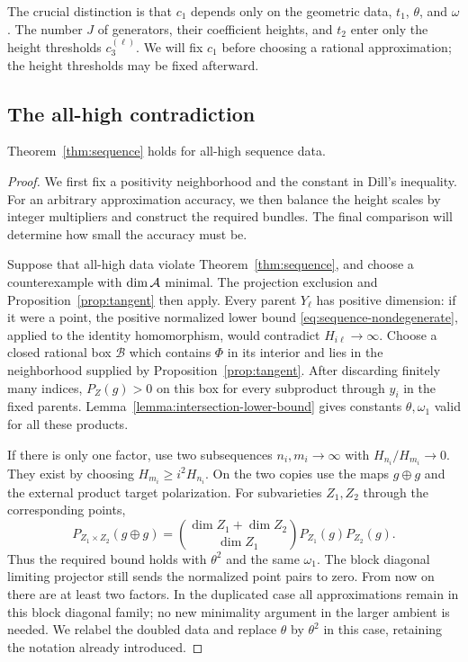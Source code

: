 The crucial distinction is that $c_1$ depends only on the geometric data,
$t_1$, $\theta$, and $\omega$.  The number $J$ of generators, their
coefficient heights, and $t_2$ enter only the height thresholds
$c_3^{(\ell)}$.  We will fix $c_1$ before choosing a rational
approximation; the height thresholds may be fixed afterward.

\subsection{The all-high contradiction}

\begin{theorem}\label{thm:all-high}
Theorem~\ref{thm:sequence} holds for all-high sequence data.
\end{theorem}

\begin{proof}
We first fix a positivity neighborhood and the constant in Dill's
inequality. For an arbitrary approximation accuracy, we then balance the
height scales by integer multipliers and construct the required bundles.
The final comparison will determine how small the accuracy must be.

Suppose that all-high data violate Theorem~\ref{thm:sequence}, and
choose a counterexample with $\dim\mathcal A$ minimal.
The projection exclusion and Proposition~\ref{prop:tangent} then apply.
Every parent $Y_\ell$ has positive dimension: if it were a point,
the positive normalized lower bound \eqref{eq:sequence-nondegenerate},
applied to the identity homomorphism, would contradict $H_{i\ell}\to\infty$.
Choose a closed rational box $\mathcal B$ which contains $\Phi$ in its
interior and lies in the neighborhood supplied by
Proposition~\ref{prop:tangent}.  After discarding finitely many indices,
$P_Z(g)>0$ on this box for every subproduct through $y_i$ in the fixed
parents.  Lemma~\ref{lemma:intersection-lower-bound} gives constants
$\theta,\omega_1$ valid for all these products.

If there is only one factor, use two subsequences $n_i,m_i\to\infty$
with $H_{n_i}/H_{m_i}\to0$.  They exist by choosing
$H_{m_i}\ge i^2H_{n_i}$.  On the two copies use the maps $g\oplus g$
and the external product target polarization.  For subvarieties
$Z_1,Z_2$ through the corresponding points,
\[
 P_{Z_1\times Z_2}(g\oplus g)
   =\binom{\dim Z_1+\dim Z_2}{\dim Z_1}P_{Z_1}(g)P_{Z_2}(g).
\]
Thus the required bound holds with $\theta^2$ and the same $\omega_1$.
The block diagonal limiting projector still sends the normalized
point pairs to zero.  From now on there are at least two factors.
In the duplicated case all approximations remain in this block diagonal
family; no new minimality argument in the larger ambient is needed.
We relabel the doubled data and replace $\theta$ by $\theta^2$ in this
case, retaining the notation already introduced.


\end{proof}
